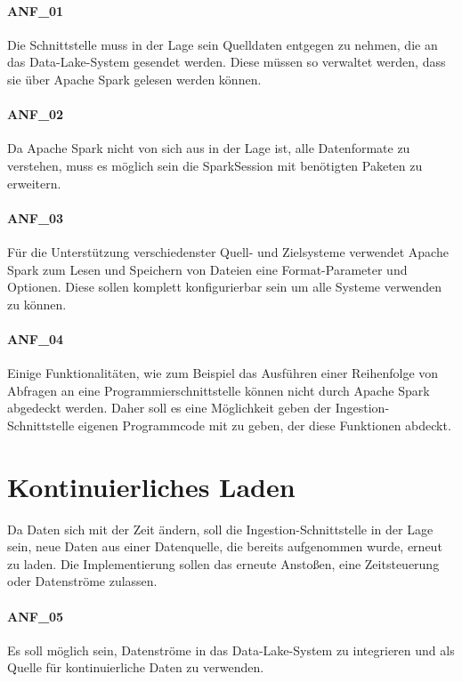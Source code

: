 \paragraph{ANF\_01}
\label{ANF_01}
Die Schnittstelle muss in der Lage sein Quelldaten entgegen zu nehmen, die an das Data-Lake-System gesendet werden.
Diese müssen so verwaltet werden, dass sie über Apache Spark gelesen werden können.

\paragraph{ANF\_02}
\label{ANF_02}
Da Apache Spark nicht von sich aus in der Lage ist, alle Datenformate zu verstehen, muss es möglich sein die SparkSession mit benötigten Paketen zu erweitern.

\paragraph{ANF\_03}
\label{ANF_03}
Für die Unterstützung verschiedenster Quell- und Zielsysteme verwendet Apache Spark zum Lesen und Speichern von Dateien eine Format-Parameter und Optionen.
Diese sollen komplett konfigurierbar sein um alle Systeme verwenden zu können.

\paragraph{ANF\_04}
\label{ANF_04}
Einige Funktionalitäten, wie zum Beispiel das Ausführen einer Reihenfolge von Abfragen an eine Programmierschnittstelle können nicht durch Apache Spark abgedeckt werden.
Daher soll es eine Möglichkeit geben der Ingestion-Schnittstelle eigenen Programmcode mit zu geben, der diese Funktionen abdeckt.

\section{Kontinuierliches Laden}
Da Daten sich mit der Zeit ändern, soll die Ingestion-Schnittstelle in der Lage sein, neue Daten aus einer Datenquelle, die bereits aufgenommen wurde, erneut zu laden.
Die Implementierung sollen das erneute Anstoßen, eine Zeitsteuerung oder Datenströme zulassen.

\paragraph{ANF\_05}
\label{ANF_05}
Es soll möglich sein, Datenströme in das Data-Lake-System zu integrieren und als Quelle für kontinuierliche Daten zu verwenden.

